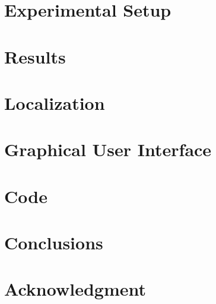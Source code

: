 \documentclass[journal]{IEEEtran}
\begin{document}
\section{Experimental Setup}
  
  
\section{Results}
  
  
\section{Localization}
  

\section{Graphical User Interface}
  
  
\section{Code}
  

\section{Conclusions}
  

\appendices


\section*{Acknowledgment}
  



\ifCLASSOPTIONcaptionsoff
  \newpage
\fi







%
%


\end{document}
